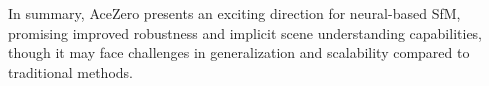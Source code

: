In summary, AceZero presents an exciting direction for neural-based SfM, promising improved robustness and implicit scene understanding capabilities, though it may face challenges in generalization and scalability compared to traditional methods.





